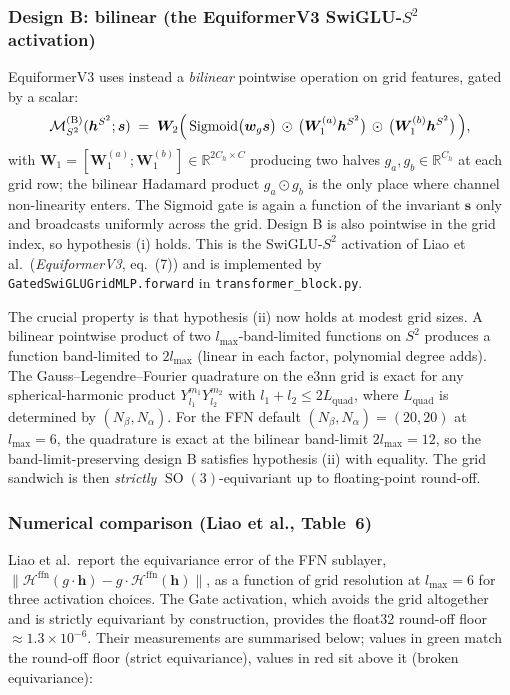 \documentclass[11pt,a4paper]{article}
\DeclareMathOperator{\SO}{SO}
\DeclareMathOperator{\Sigmoid}{Sigmoid}
\newcommand{\R}{\mathbb{R}}
\newcommand{\Sph}{S^2}
\newcommand{\bh}{\bm{h}}
\newcommand{\lmax}{l_{\max}}
\newcommand{\Hb}{\mathcal{H}}
\theoremstyle{plain}
\theoremstyle{definition}
\theoremstyle{remark}
\begin{document}
\subsubsection*{Design B: bilinear (the EquiformerV3 SwiGLU-$\Sph$ activation)}

EquiformerV3 uses instead a \emph{bilinear} pointwise operation on grid
features, gated by a scalar:
\begin{equation}\label{eq:gridmlp-B}
    \mathcal{M}_{\Sph}^{(\mathrm{B})}(\bh^{\Sph};\bm{s})\;=\;\bm{W}_2\Bigl(\,\Sigmoid\bigl(\bm{w}_g\bm{s}\bigr)\,\odot\,\bigl(\bm{W}_1^{(a)}\bh^{\Sph}\bigr)\,\odot\,\bigl(\bm{W}_1^{(b)}\bh^{\Sph}\bigr)\,\Bigr),
\end{equation}
with $\bm{W}_1=[\bm{W}_1^{(a)};\bm{W}_1^{(b)}]\in\R^{2C_h\times C}$ producing two halves $g_a,g_b\in\R^{C_h}$ at each grid row; the bilinear Hadamard product $g_a\odot g_b$ is the only place where channel non-linearity enters.
The Sigmoid gate is again a function of the invariant $\bm{s}$ only and broadcasts uniformly across the grid.
Design B is also pointwise in the grid index, so hypothesis (i) holds.
This is the SwiGLU-$\Sph$ activation of Liao et al.\ (\emph{EquiformerV3}, eq.~(7)) and is implemented by \texttt{GatedSwiGLUGridMLP.forward} in \texttt{transformer\_block.py}.

The crucial property is that hypothesis (ii) now holds at modest grid sizes. A
bilinear pointwise product of two $\lmax$-band-limited functions on $\Sph$
produces a function band-limited to $2\lmax$ (linear in each factor, polynomial
degree adds). The Gauss--Legendre--Fourier quadrature on the e3nn grid is exact
for any spherical-harmonic product $Y_{l_1}^{m_1}Y_{l_2}^{m_2}$ with
$l_1+l_2\le 2L_{\mathrm{quad}}$, where $L_{\mathrm{quad}}$ is determined by
$(N_\beta,N_\alpha)$. For the FFN default $(N_\beta,N_\alpha)=(20,20)$ at
$\lmax=6$, the quadrature is exact at the bilinear band-limit $2\lmax=12$, so
the band-limit-preserving design B satisfies hypothesis (ii) with equality. The
grid sandwich is then \emph{strictly} $\SO(3)$-equivariant up to floating-point
round-off.

\subsubsection*{Numerical comparison (Liao et al., Table~6)}

Liao et al.\ report the equivariance error of the FFN sublayer,
$\|\Hb^{\mathrm{ffn}}(g\cdot\bh)-g\cdot\Hb^{\mathrm{ffn}}(\bh)\|$, as a
function of grid resolution at $\lmax=6$ for three activation choices. The Gate
activation, which avoids the grid altogether and is strictly equivariant by
construction, provides the float32 round-off floor $\approx 1.3\times 10^{-6}$.
Their measurements are summarised below; values in green match the round-off
floor (strict equivariance), values in red sit above it (broken equivariance):
\end{document}
